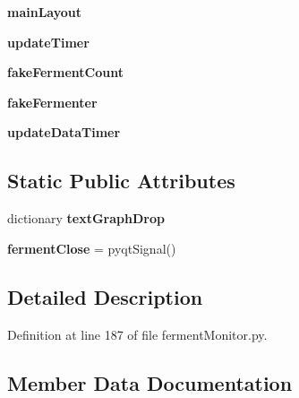 \begin{DoxyCompactItemize}
{\bfseries main\+Layout}
\item 
\mbox{\label{classferment_monitor_1_1_ferment_monitor_afc4ef95f04c9ce819544ce1414a7b1d5}} 
{\bfseries update\+Timer}
\item 
\mbox{\label{classferment_monitor_1_1_ferment_monitor_a9284947d8c81932adf9b30767a2bf54a}} 
{\bfseries fake\+Ferment\+Count}
\item 
\mbox{\label{classferment_monitor_1_1_ferment_monitor_a29a6a7145b2c57e56461a8a82a6c03a6}} 
{\bfseries fake\+Fermenter}
\item 
\mbox{\label{classferment_monitor_1_1_ferment_monitor_a477a63d012dac86da87df3899c4eee55}} 
{\bfseries update\+Data\+Timer}
\end{DoxyCompactItemize}
\subsection*{Static Public Attributes}
\begin{DoxyCompactItemize}
\item 
dictionary {\bfseries text\+Graph\+Drop}
\item 
\mbox{\label{classferment_monitor_1_1_ferment_monitor_aa6531443910ee1ce36317e52cc75145d}} 
{\bfseries ferment\+Close} = pyqt\+Signal()
\end{DoxyCompactItemize}


\subsection{Detailed Description}


Definition at line 187 of file ferment\+Monitor.\+py.



\subsection{Member Data Documentation}
\mbox{\label{classferment_monitor_1_1_ferment_monitor_a7fd0498f3cac96a071ae90cd103ebe5e}} 
